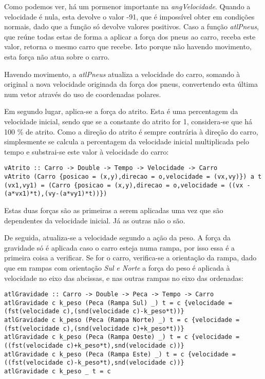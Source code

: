 \documentclass[a4paper]{report}
\begin{document}
Como podemos ver, há um pormenor importante na \textit{angVelocidade}. Quando a velocidade é nula, esta devolve o valor -91, que é impossível obter em condições normais, dado que a função só devolve valores positivos. Caso a função \textit{atlPneus}, que reúne todas estas de forma a aplicar a força dos pneus ao carro, receba este valor, retorna o mesmo carro que recebe. Isto porque não havendo movimento, esta força não atua sobre o carro.

Havendo movimento, a \textit{atlPneus} atualiza a velocidade do carro, somando à original a nova velocidade originada da força dos pneus, convertendo esta última num vetor através do uso de coordenadas polares.

Em segundo lugar, aplica-se a força do atrito. Esta é uma percentagem da velocidade inicial, sendo que se a constante do atrito for 1, considera-se que há 100 \% de atrito. Como a direção do atrito é sempre contrária à direção do carro, simplesmente se calcula a percentagem da velocidade inicial multiplicada pelo tempo e substrai-se este valor à velocidade do carro:

\begin{lstlisting}
vAtrito :: Carro -> Double -> Tempo -> Velocidade -> Carro 
vAtrito (Carro {posicao = (x,y),direcao = o,velocidade = (vx,vy)}) a t (vx1,vy1) = (Carro {posicao = (x,y),direcao = o,velocidade = ((vx -(a*vx1)*t),(vy-(a*vy1)*t))})
\end{lstlisting}

Estas duas forças são as primeiras a serem aplicadas uma vez que são dependentes da velocidade inicial. Já as outras não o são.

De seguida, atualiza-se a velocidade segundo a ação da peso. A força da gravidade só é aplicada caso o carro esteja numa rampa, por isso essa é a primeira coisa a verificar. Se for o carro, verifica-se a orientação da rampa, dado que em rampas com orientação \textit{Sul e Norte} a força do peso é aplicada à velocidade no eixo das abcissas, e nas outras rampas no eixo das ordenadas: 

\begin{lstlisting}
atlGravidade :: Carro -> Double -> Peca -> Tempo -> Carro 
atlGravidade c k_peso (Peca (Rampa Sul) _) t = c {velocidade = (fst(velocidade c),(snd(velocidade c)-k_peso*t))}
atlGravidade c k_peso (Peca (Rampa Norte) _) t = c {velocidade = (fst(velocidade c),(snd(velocidade c)+k_peso*t))}
atlGravidade c k_peso (Peca (Rampa Oeste) _) t = c {velocidade = ((fst(velocidade c)+k_peso*t),snd(velocidade c))}
atlGravidade c k_peso (Peca (Rampa Este) _) t = c {velocidade = ((fst(velocidade c)-k_peso*t),snd(velocidade c))}
atlGravidade c k_peso _ t = c
\end{lstlisting}
\end{document}
